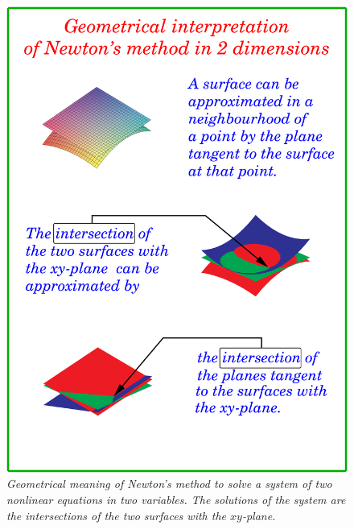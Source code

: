 \begin{figure}
  \centerline{\includegraphics[width=150mm]{figures/Newt2}}
  \caption{\label{fig:Newt2} \it Geometrical meaning of Newton's
    method to solve a system of two nonlinear equations in two
    variables.  The solutions of the system are the intersections of
    the two surfaces with the $xy$-plane.}
\end{figure}

